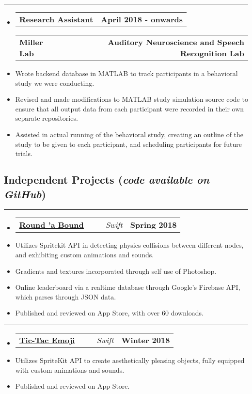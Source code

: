 \documentclass[10pt,letterpaper]{article}
\makeatletter
\newcommand{\header}[2]
{
	\begin{tabular*}{\linewidth}{l @{\extracolsep{\fill}} r}
		#1 & #2 \\
	\end{tabular*}
}
\newcommand{\sectionbreak}
{
	\vspace{-1.2em}
	\rule{\textwidth}{1.7pt}
	\vspace{-1.7em}
}
\makeatother
\begin{document}
\hrule

\begin{itemize}
	\item[]
		\header
			{\textbf{Research Assistant}} 
			{\textbf{April 2018 - onwards }}
		\header
			{\textbf{Miller Lab}}
			{\textbf{Auditory Neuroscience and Speech Recognition Lab}} 
		\item
			Wrote backend database in MATLAB to track participants in a behavioral study we were conducting.
		\item
			Revised and made modifications to MATLAB study simulation source code to ensure that all output data from each participant were recorded in their own separate repositories.
		\item 
			Assisted in actual running of the behavioral study, creating an outline of the study to be given to each participant, and scheduling participants for future trials.

\end{itemize}

\vspace{-1.5em}

\subsection*{Independent Projects (\emph{code available on GitHub})}
\sectionbreak

	

\begin{itemize}
	\item[]
		\header 
		{
		\href{https://itunes.apple.com/us/app/round-bound/id1369632746?mt=8}{\underline{\textbf{Round 'a Bound}}} \ \ \ \ \ \emph{Swift}
		}
			{\textbf{Spring 2018}}
		\item 
			Utilizes Spritekit API in detecting physics collisions between different nodes, and exhibiting custom animations and sounds.
		\item
			Gradients and textures incorporated through self use of Photoshop.
		\item
			Online leaderboard via a realtime database through Google's Firebase API, which parses through JSON data. 
		\item
			Published and reviewed on App Store, with over 60 downloads. 
\end{itemize}

\hrule

\begin{itemize}
	\item[]
		\header
			{
				\href{https://itunes.apple.com/us/app/tic-tac-emoji/id1346934986?mt=8}{\underline{\textbf{Tic-Tac Emoji}}} \ \ \ \ \ \emph{Swift}
				}
				{\textbf{Winter 2018}}
		\item
			Utilizes SpriteKit API to create aesthetically pleasing objects, fully equipped with custom animations and sounds.	
		\item
			Published and reviewed on App Store. 
\end{itemize}
\end{document}
